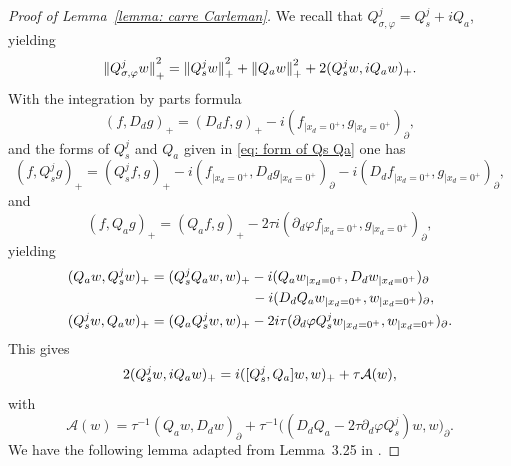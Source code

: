 \documentclass[10pt]{amsart}
\theoremstyle{plain}
\theoremstyle{definition}
\let \Re \relax
\DeclareMathOperator{\Re}{Re}
\newcommand{\inp}[2]{(#1, #2)}
\newcommand{\biginp}[2]{\big(#1, #2 \big)}
\newcommand{\br}{\ensuremath{_{|x_d=0^+}}}
\newcommand{\Norm}[2]{{\| #1 \|}_{#2}}
\newcommand{\Qconj}{Q_{\sigma,\varphi}}
\newcommand{\Qs}{Q_{s}}
\newcommand{\Qa}{Q_{a}}
\begin{document}
\begin{proof}[Proof of Lemma~\ref{lemma: carre Carleman}]
We recall that $\Qconj^j=\Qs^j+i\Qa$, yielding
\begin{equation}
\label{eq: carre Carleman}
\Norm{\Qconj^j w}{+}^2
=\Norm{\Qs^j w}{+}^2 +\Norm{\Qa w}{+}^2
+2\Re \inp{\Qs^jw}{i\Qa w}_+.
\end{equation}
With the integration by parts formula
\begin{equation*}
\inp{f}{D_d g}_+=\inp{D_d f}{g}_+- i \inp{f\br}{g\br}_{\partial},
\end{equation*}
and the forms of $\Qs^j$ and $\Qa$ given in \eqref{eq: form of Qs Qa} one has
\begin{equation*}
\inp{f}{\Qs^j g}_+ = \inp{\Qs^j f}{ g}_+
- i \inp{f\br}{D_d g\br}_{\partial} - i \inp{D_d f\br}{g\br}_{\partial},
\end{equation*}
and
\begin{equation*}
\inp{f}{\Qa g}_+ = \inp{\Qa f}{ g}_+
- 2 \tau i \inp{ \partial_d \varphi f\br}{ g\br}_{\partial},
\end{equation*}
yielding
\begin{align*}
\inp{\Qa w}{\Qs^jw}_+
&=\inp{\Qs^j\Qa w}{w}_+
-i \inp{\Qa w\br}{D_d w\br}_{\partial}\\
&\hspace*{2.55cm} -i \inp{D_d\Qa w\br}{w\br}_{\partial},\\
\inp{\Qs^jw}{\Qa w}_+
&=\inp{\Qa\Qs^jw}{w}_+
-2i\tau\inp{\partial_d\varphi \Qs^jw \br}{w\br}_{\partial}.
\end{align*}
This gives
\begin{equation}
\label{eq: double product after IPP}
2\Re \inp{\Qs^jw}{i\Qa w}_+
= i \inp{[\Qs^j,\Qa]w}{w}_+
+\tau\mathcal{A}(w),
\end{equation}
with
\begin{equation}
\label{eq: boundary quadratic form}
\mathcal{A}(w)
=\tau^{-1} \inp{\Qa w}{D_d w}_{\partial}
+\tau^{-1} \biginp{(D_d\Qa -2 \tau \partial_d\varphi \Qs^j)w}{w}_{\partial}.
\end{equation}
We have the following lemma adapted from Lemma~3.25 in \cite{JGL-vol1}.


\end{proof}
\end{document}
